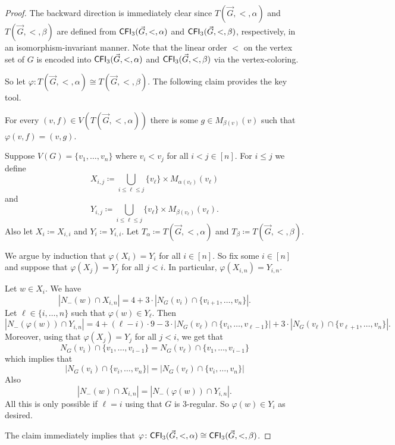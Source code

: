 \documentclass{theoretics}
\newcommand{\CFI}{{\sf CFI}}
\begin{document}
\begin{proof}
 The backward direction is immediately clear since $T(\vec{G},<,\alpha)$ and $T(\vec{G},<,\beta)$ are defined from $\CFI_3(\vec{G},<,\alpha)$ and $\CFI_3(\vec{G},<,\beta)$, respectively, in an isomorphism-invariant manner.
 Note that the linear order $<$ on the vertex set of $G$ is encoded into $\CFI_3(\vec{G},<,\alpha)$ and $\CFI_3(\vec{G},<,\beta)$ via the vertex-coloring.

 So let $\varphi\colon T(\vec{G},<,\alpha) \cong T(\vec{G},<,\beta)$.
 The following claim provides the key tool.

 \begin{claim}
  For every $(v,f) \in V(T(\vec{G},<,\alpha))$ there is some $g \in M_{\beta(v)}(v)$ such that $\varphi(v,f) = (v,g)$.
 \end{claim}
 \begin{subproof}
  Suppose $V(G) = \{v_1,\dots,v_n\}$ where $v_i < v_j$ for all $i < j \in [n]$.
  For $i \leq j$ we define
  \[X_{i,j} \coloneqq \bigcup_{i \leq \ell \leq j} \{v_\ell\} \times M_{\alpha(v_\ell)}(v_\ell)\]
  and
  \[Y_{i,j} \coloneqq \bigcup_{i \leq \ell \leq j} \{v_\ell\} \times M_{\beta(v_\ell)}(v_\ell).\]
  Also let $X_i \coloneqq X_{i,i}$ and $Y_i \coloneqq Y_{i,i}$.
  Let $T_\alpha \coloneqq T(\vec{G},<,\alpha)$ and $T_\beta \coloneqq T(\vec{G},<,\beta)$.

  We argue by induction that $\varphi(X_i) = Y_i$ for all $i \in [n]$.
  So fix some $i \in [n]$ and suppose that $\varphi(X_j) = Y_j$ for all $j < i$.
  In particular, $\varphi(X_{i,n}) = Y_{i,n}$.

  Let $w \in X_i$.
  We have
  \[|N_-(w) \cap X_{i,n}| = 4 + 3 \cdot |N_G(v_i) \cap \{v_{i+1},\dots,v_n\}|.\]
  Let $\ell \in \{i,\dots,n\}$ such that $\varphi(w) \in Y_\ell$.
  Then
  \[|N_-(\varphi(w)) \cap Y_{i,n}| = 4 + (\ell - i) \cdot 9 - 3 \cdot |N_G(v_\ell) \cap \{v_{i},\dots,v_{\ell-1}\}| +  3 \cdot |N_G(v_\ell) \cap \{v_{\ell+1},\dots,v_n\}|.\]
  Moreover, using that $\varphi(X_j) = Y_j$ for all $j < i$, we get that
  \[N_G(v_i) \cap \{v_1,\dots,v_{i-1}\} = N_G(v_\ell) \cap \{v_1,\dots,v_{i-1}\}\]
  which implies that
  \[|N_G(v_i) \cap \{v_i,\dots,v_n\}| = |N_G(v_\ell) \cap \{v_i,\dots,v_n\}|\]
  Also
  \[|N_-(w) \cap X_{i,n}| = |N_-(\varphi(w)) \cap Y_{i,n}|.\]
  All this is only possible if $\ell = i$ using that $G$ is $3$-regular.
  So $\varphi(w) \in Y_i$ as desired.
 \end{subproof}

 The claim immediately implies that $\varphi\colon\CFI_3(\vec{G},<,\alpha) \cong \CFI_3(\vec{G},<,\beta)$.
\end{proof}
\end{document}
